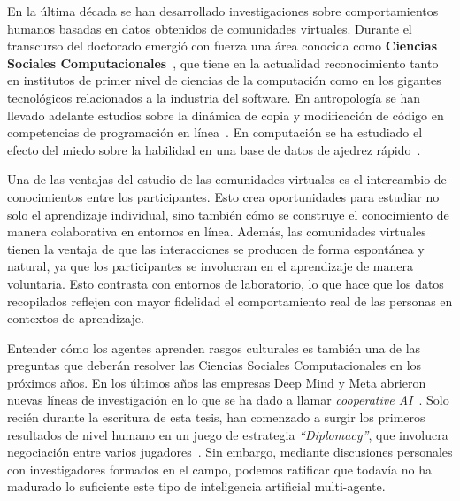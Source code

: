 \documentclass[a4paper,11pt]{book}
\theoremstyle{definition}
\begin{document}

En la \'ultima d\'ecada se han desarrollado investigaciones sobre comportamientos humanos basadas en datos obtenidos de comunidades virtuales.
%
Durante el transcurso del doctorado emergi\'o con fuerza una \'area conocida como \textbf{Ciencias Sociales Computacionales}~\cite{Lazer2009,Lazer2020}, que tiene en la actualidad reconocimiento tanto en institutos de primer nivel de ciencias de la computaci\'on como en los gigantes tecnol\'ogicos relacionados a la industria del software.
%
En antropolog\'ia se han llevado adelante estudios sobre la din\'amica de copia y modificaci\'on de c\'odigo en competencias de programaci\'on en l\'inea~\cite{miu2018-cumulativeCultureOnlineProgrammingContests}.
%
En computaci\'on se ha estudiado el efecto del miedo sobre la habilidad en una base de datos de ajedrez r\'apido~\cite{slezak2012-doNotFearYourOpponent}.


Una de las ventajas del estudio de las comunidades virtuales es el intercambio de conocimientos entre los participantes.
%
Esto crea oportunidades para estudiar no solo el aprendizaje individual, sino tambi\'en c\'omo se construye el conocimiento de manera colaborativa en entornos en l\'inea.
%
Adem\'as, las comunidades virtuales tienen la ventaja de que las interacciones se producen de forma espont\'anea y natural, ya que los participantes se involucran en el aprendizaje de manera voluntaria.
%
Esto contrasta con entornos de laboratorio, lo que hace que los datos recopilados reflejen con mayor fidelidad el comportamiento real de las personas en contextos de aprendizaje.


Entender c\'omo los agentes aprenden rasgos culturales es tambi\'en una de las preguntas que deber\'an resolver las Ciencias Sociales Computacionales en los pr\'oximos a\~nos.
%
En los \'ultimos a\~nos las empresas Deep Mind y Meta abrieron nuevas l\'ineas de investigaci\'on en lo que se ha dado a llamar \emph{cooperative AI}~\cite{dafoe2020-coopAI,dafoe2021-coopAIcomment}.
%
Solo reci\'en durante la escritura de esta tesis, han comenzado a surgir los primeros resultados de nivel humano en un juego de estrategia \emph{``Diplomacy''}, que involucra negociaci\'on entre varios jugadores~\cite{kramar2022-deepMindDiplomacy,meta2022-diplomacy}.
%
Sin embargo, mediante discusiones personales con investigadores formados en el campo, podemos ratificar que todav\'ia no ha madurado lo suficiente este tipo de inteligencia artificial multi-agente.
\end{document}
